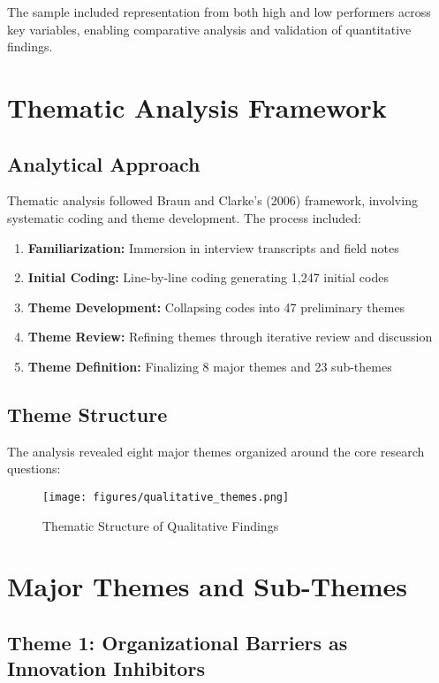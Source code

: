 The sample included representation from both high and low performers across key variables, enabling comparative analysis and validation of quantitative findings.

\section{Thematic Analysis Framework}

\subsection{Analytical Approach}

Thematic analysis followed Braun and Clarke's (2006) framework, involving systematic coding and theme development. The process included:

\begin{enumerate}
    \item \textbf{Familiarization:} Immersion in interview transcripts and field notes
    \item \textbf{Initial Coding:} Line-by-line coding generating 1,247 initial codes
    \item \textbf{Theme Development:} Collapsing codes into 47 preliminary themes
    \item \textbf{Theme Review:} Refining themes through iterative review and discussion
    \item \textbf{Theme Definition:} Finalizing 8 major themes and 23 sub-themes
\end{enumerate}

\subsection{Theme Structure}

The analysis revealed eight major themes organized around the core research questions:

\begin{figure}[H]
\centering
\texttt{[image: figures/qualitative\_themes.png]}
\caption{Thematic Structure of Qualitative Findings}
\label{fig:qualitative_themes}
\end{figure}

\section{Major Themes and Sub-Themes}

\subsection{Theme 1: Organizational Barriers as Innovation Inhibitors}

